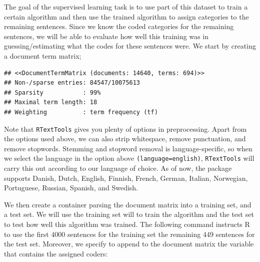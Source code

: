 \documentclass[
]{article}
\newenvironment{Shaded}{\begin{snugshade}}{\end{snugshade}}
\newcommand{\AttributeTok}[1]{\textcolor[rgb]{0.77,0.63,0.00}{#1}}
\newcommand{\ConstantTok}[1]{\textcolor[rgb]{0.00,0.00,0.00}{#1}}
\newcommand{\FloatTok}[1]{\textcolor[rgb]{0.00,0.00,0.81}{#1}}
\newcommand{\FunctionTok}[1]{\textcolor[rgb]{0.00,0.00,0.00}{#1}}
\newcommand{\NormalTok}[1]{#1}
\newcommand{\OtherTok}[1]{\textcolor[rgb]{0.56,0.35,0.01}{#1}}
\newcommand{\SpecialCharTok}[1]{\textcolor[rgb]{0.00,0.00,0.00}{#1}}
\newcommand{\StringTok}[1]{\textcolor[rgb]{0.31,0.60,0.02}{#1}}
\begin{document}
The goal of the supervised learning task is to use part of this dataset to train a certain algorithm and then use the trained algorithm to assign categories to the remaining sentences. Since we know the coded categories for the remaining sentences, we will be able to evaluate how well this training was in guessing/estimating what the codes for these sentences were. We start by creating a document term matrix;

\begin{Shaded}
\end{Shaded}

\begin{verbatim}
## <<DocumentTermMatrix (documents: 14640, terms: 694)>>
## Non-/sparse entries: 84547/10075613
## Sparsity           : 99%
## Maximal term length: 18
## Weighting          : term frequency (tf)
\end{verbatim}

Note that \texttt{RTextTools} gives you plenty of options in preprocessing. Apart from the options used above, we can also strip whitespace, remove punctuation, and remove stopwords. Stemming and stopword removal is language-specific, so when we select the language in the option above \texttt{(language=\textquotesingle{}\textquotesingle{}english\textquotesingle{}\textquotesingle{})}, \texttt{RTextTools} will carry this out according to our language of choice. As of now, the package supports Danish, Dutch, English, Finnish, French, German, Italian, Norwegian, Portuguese, Russian, Spanish, and Swedish.

We then create a container parsing the document matrix into a training set, and a test set. We will use the training set will to train the algorithm and the test set to test how well this algorithm was trained. The following command instructs R to use the first 4000 sentences for the training set the remaining 449 sentences for the test set. Moreover, we specify to append to the document matrix the variable that contains the assigned coders:
\end{document}

